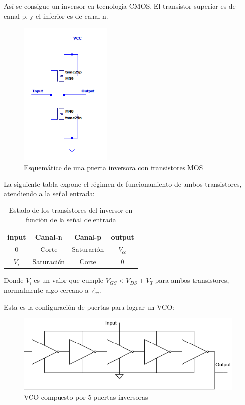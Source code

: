 \documentclass[12pt]{report} %
\begin{document}
	Así se consigue un inversor en tecnología CMOS. El transistor superior es de canal-p, y el inferior es de canal-n.
	\begin{figure}[H]
		\includegraphics[width=0.4\textwidth]{inverter-sch.png}
		\caption[Esquemático de una puerta inversora con transistores MOS]{Esquemático de una puerta inversora con transistores MOS}
		\label{fig:inverter-sch.png}
	\end{figure}
	
	La siguiente tabla expone el régimen de funcionamiento de ambos transistores, atendiendo a la señal entrada:
	
	\begin{table}[H]\caption{Estado de los transistores del inversor en función de la señal de entrada}\label{tb:inverter-trans-state}
		\begin{tabular}{|c|c|c|c|}
			\hline
			input & Canal-n & Canal-p & output\\
			\hline
			0 & Corte & Saturación & $V_{cc}$ \\
			\hline
			$V_{i}$ & Saturación & Corte & 0 \\
			\hline
		\end{tabular}
	\end{table}
	
	Donde $V_i$ es un valor que cumple $V_{GS} < V_{DS} + V_{T}$ para ambos transistores, normalmente algo cercano a $V_{cc}$.
	
	Esta es la configuración de puertas para lograr un VCO:
	
	\begin{figure}[H]
		\includegraphics[width=\textwidth]{vco-symbol.png}
		\caption[VCO compuesto por 5 puertas inversoras]{VCO compuesto por 5 puertas inversoras}
		\label{fig:vco-symbol.png}
	\end{figure}
	
\end{document}
